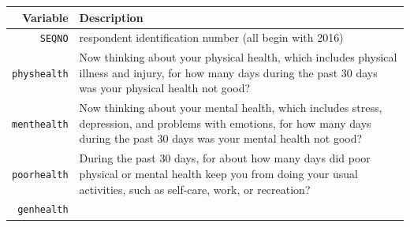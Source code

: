 \documentclass[]{book}
\theoremstyle{definition}
\theoremstyle{definition}
\theoremstyle{definition}
\theoremstyle{remark}
\begin{document}
\begin{longtable}[]{@{}rl@{}}
\toprule
\begin{minipage}[b]{0.14\columnwidth}\raggedleft\strut
Variable\strut
\end{minipage} & \begin{minipage}[b]{0.74\columnwidth}\raggedright\strut
Description\strut
\end{minipage}\tabularnewline
\midrule
\endhead
\begin{minipage}[t]{0.14\columnwidth}\raggedleft\strut
\texttt{SEQNO}\strut
\end{minipage} & \begin{minipage}[t]{0.74\columnwidth}\raggedright\strut
respondent identification number (all begin with 2016)\strut
\end{minipage}\tabularnewline
\begin{minipage}[t]{0.14\columnwidth}\raggedleft\strut
\texttt{physhealth}\strut
\end{minipage} & \begin{minipage}[t]{0.74\columnwidth}\raggedright\strut
Now thinking about your physical health, which includes physical illness
and injury, for how many days during the past 30 days was your physical
health not good?\strut
\end{minipage}\tabularnewline
\begin{minipage}[t]{0.14\columnwidth}\raggedleft\strut
\texttt{menthealth}\strut
\end{minipage} & \begin{minipage}[t]{0.74\columnwidth}\raggedright\strut
Now thinking about your mental health, which includes stress,
depression, and problems with emotions, for how many days during the
past 30 days was your mental health not good?\strut
\end{minipage}\tabularnewline
\begin{minipage}[t]{0.14\columnwidth}\raggedleft\strut
\texttt{poorhealth}\strut
\end{minipage} & \begin{minipage}[t]{0.74\columnwidth}\raggedright\strut
During the past 30 days, for about how many days did poor physical or
mental health keep you from doing your usual activities, such as
self-care, work, or recreation?\strut
\end{minipage}\tabularnewline
\begin{minipage}[t]{0.14\columnwidth}\raggedleft\strut
\texttt{genhealth}\strut
\end{minipage} & \begin{minipage}[t]{0.74\columnwidth}\raggedright\strut

\end{minipage}
\end{longtable}
\end{document}
